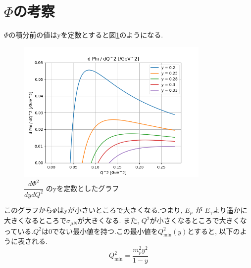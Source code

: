 \section{\texorpdfstring{$\Phi$}{LG}の考察}\label{section2_3}
$\Phi$の積分前の値はyを定数とすると図\ref{fig:sigma3}のようになる.
\begin{figure}[H]
    \centering
    \includegraphics[height=7cm]{img/flux_fixed_y.png}
    \caption{$\dfrac{d\Phi ^2}{dydQ^2}$ のyを定数としたグラフ}
    \label{fig:sigma3}
\end{figure}
このグラフから$\Phi$はyが小さいところで大きくなる.つまり, $E_\mu$ が $E_\gamma$より遥かに大きくなるところで$\sigma_{\mu N}$が大きくなる.
また, $Q^2$が小さくなるところで大きくなっている.$Q^2$は0でない最小値を持つ.この最小値を$Q^2_{\mathrm{min}}(y)$とすると, 以下のように表される.
\begin{equation}
    \label{eq2_8}
    Q^2_{\mathrm{min}} = \dfrac{m_p^2 y^2}{1-y}
\end{equation}

